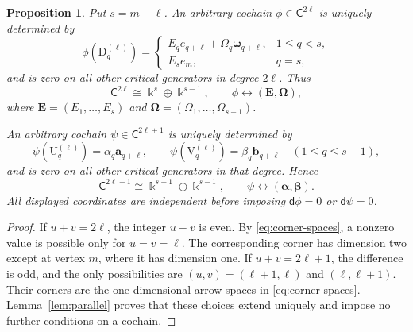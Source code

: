 \documentclass[a4paper,11pt,oneside,reqno]{amsart}
\newtheorem{proposition}[theorem]{Proposition}
\theoremstyle{definition}
\numberwithin{equation}{section}
\begin{document}
	\begin{proposition}\label{prop:cochain-coordinates}
		Put $s=m-\ell$.
		An arbitrary cochain $\phi\in \mathsf C^{2\ell}$ is uniquely determined by
		\begin{equation}\label{eq:even-values}
			\phi(\mathrm{D}_q^{(\ell)})=
			\begin{cases}
				E_qe_{q+\ell}+\Omega_q\boldsymbol{\omega}_{q+\ell},&1\leq q<s,\\
				E_se_m,&q=s,
			\end{cases}
		\end{equation}
		and is zero on all other critical generators in degree $2\ell$.
		Thus
		\begin{equation}\label{eq:even-coordinate-space}
			\mathsf C^{2\ell}\cong \Bbbk^s\oplus \Bbbk^{s-1},\qquad
			\phi\longleftrightarrow(\mathbf E,\boldsymbol\Omega),
		\end{equation}
		where $\mathbf E=(E_1,\ldots,E_s)$ and
		$\boldsymbol\Omega=(\Omega_1,\ldots,\Omega_{s-1})$.
		
		An arbitrary cochain $\psi\in \mathsf C^{2\ell+1}$ is uniquely determined by
		\begin{equation}\label{eq:odd-values}
			\psi(\mathrm{U}_q^{(\ell)})=\alpha_q \mathbf{a}_{q+\ell},\qquad
			\psi(\mathrm{V}_q^{(\ell)})=\beta_q \mathbf{b}_{q+\ell}
			\quad(1\leq q\leq s-1),
		\end{equation}
		and is zero on all other critical generators in that degree.  Hence
		\begin{equation}\label{eq:odd-coordinate-space}
			\mathsf C^{2\ell+1}\cong \Bbbk^{s-1}\oplus \Bbbk^{s-1},\qquad
			\psi\longleftrightarrow(\boldsymbol\alpha,\boldsymbol\beta).
		\end{equation}
		All displayed coordinates are independent before imposing $\mathsf d\phi=0$
		or $\mathsf d\psi=0$.
	\end{proposition}
	
	\begin{proof}
		If $u+v=2\ell$, the integer $u-v$ is even.  By
		\eqref{eq:corner-spaces}, a nonzero value is possible only for $u=v=\ell$.
		The corresponding corner has dimension two except at vertex $m$,
		where it has dimension one.  If $u+v=2\ell+1$, the difference is odd,
		and the only possibilities are $(u,v)=(\ell+1,\ell)$ and
		$(\ell,\ell+1)$.  Their corners are the one-dimensional arrow spaces
		in \eqref{eq:corner-spaces}.  Lemma~\ref{lem:parallel} proves that these
		choices extend uniquely and impose no further conditions on a cochain.
	\end{proof}
	
\end{document}
